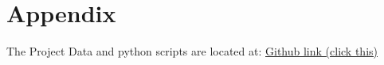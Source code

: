 \documentclass[12pt]{article}
\begin{document}






\newpage
\section*{Appendix}


The Project Data and python scripts are located at:
\href{https://github.com/ZHBALEX/Numerical-CFD/tree/cd4f80f52957a564282440dbf4f327c3e4eac02a/CFD%20Projects/CFD_Final_Circular_Cylinder_Cross-Flow}{Github link (click this)}
\end{document}
